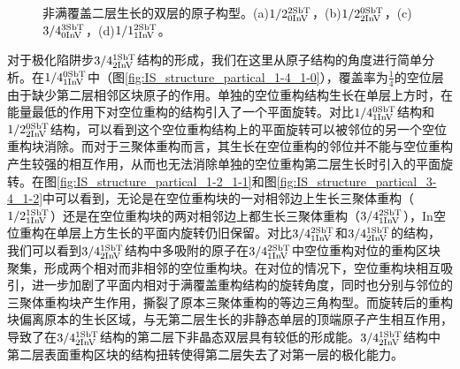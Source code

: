 \begin{figure}[htb]
{        \label{fig:IS_structure_partical_3-4_0-3}
    }
    \caption{非满覆盖二层生长的双层的原子构型。(a)$\rm 1/2{}_{0InV}^{2SbT} \it$，(b)$\rm 1/2{}_{2InV}^{0SbT} \it$，(c)$\rm 3/4{}_{0InV}^{3SbT} \it$，(d)$\rm 1/1{}_{1InV}^{2SbT} \it$。}
    \label{fig:IS_structure_partical_1}
\end{figure}

对于极化陷阱步$\rm 3/4{}_{2InV}^{1SbT} \it$结构的形成，我们在这里从原子结构的角度进行简单分析。在$\rm 1/4{}_{1InV}^{0SbT} \it$中（图\ref{fig:IS_structure_partical_1-4_1-0}），覆盖率为$\frac{1}{4}$的空位层由于缺少第二层相邻区块原子的作用。单独的空位重构结构生长在单层上方时，在能量最低的作用下对空位重构的结构引入了一个平面旋转。对比$\rm 1/4{}_{1InV}^{0SbT} \it$结构和$\rm 1/2{}_{2InV}^{0SbT} \it$结构，可以看到这个空位重构结构上的平面旋转可以被邻位的另一个空位重构块消除。而对于三聚体重构而言，其生长在空位重构的邻位并不能与空位重构产生较强的相互作用，从而也无法消除单独的空位重构第二层生长时引入的平面旋转。在图\ref{fig:IS_structure_partical_1-2_1-1}和图\ref{fig:IS_structure_partical_3-4_1-2}中可以看到，无论是在空位重构块的一对相邻边上生长三聚体重构（$\rm 1/2{}_{1InV}^{1SbT} \it$）还是在空位重构块的两对相邻边上都生长三聚体重构（$\rm 3/4{}_{1InV}^{2SbT} \it$），{In}空位重构在单层上方生长的平面内旋转仍旧保留。对比$\rm 3/4{}_{1InV}^{2SbT} \it$和$\rm 3/4{}_{2InV}^{1SbT} \it$的结构，我们可以看到$\rm 3/4{}_{2InV}^{1SbT} \it$结构中多吸附的原子在$\rm 3/4{}_{1InV}^{2SbT} \it$中空位重构对位的重构区块聚集，形成两个相对而非相邻的空位重构块。在对位的情况下，空位重构块相互吸引，进一步加剧了平面内相对于满覆盖重构结构的旋转角度，同时也分别与邻位的三聚体重构块产生作用，撕裂了原本三聚体重构的等边三角构型。而旋转后的重构块偏离原本的生长区域，与无第二层生长的非静态单层的顶端原子产生相互作用，导致了在$\rm 3/4{}_{2InV}^{1SbT} \it$结构的第二层下非晶态双层具有较低的形成能。$\rm 3/4{}_{2InV}^{1SbT} \it$结构中第二层表面重构区块的结构扭转使得第二层失去了对第一层的极化能力。

